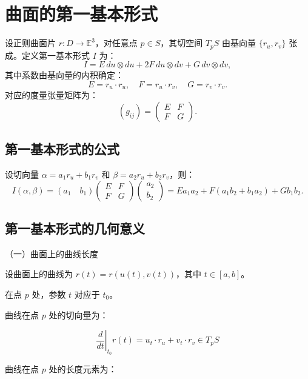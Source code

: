 \documentclass[lang=cn,10pt,thmcnt=section]{elegantbook}
\begin{document}
\section{曲面的第一基本形式}
\begin{definition}[第一基本形式]
    设正则曲面片 \( r: D \to \mathbb{E}^3 \)，对任意点 \( p \in S \)，其切空间 \( T_pS \) 由基向量 \(\{r_u, r_v\}\) 张成。定义第一基本形式 \( I \) 为：
\[
I = E \, du \otimes du + 2F \, du \otimes dv + G \, dv \otimes dv,
\]
其中系数由基向量的内积确定：
\[
E = r_u \cdot r_u, \quad F = r_u \cdot r_v, \quad G = r_v \cdot r_v.
\]
对应的度量张量矩阵为：
\[
(g_{ij}) = \begin{pmatrix}
E & F \\
F & G
\end{pmatrix}.
\]
\end{definition}
\subsection*{第一基本形式的公式}
设切向量 \(\alpha = a_1 r_u + b_1 r_v\) 和 \(\beta = a_2 r_u + b_2 r_v\)，则：
\[
I(\alpha, \beta) = (a_1 \quad b_1) \begin{pmatrix}
E & F \\
F & G
\end{pmatrix} \begin{pmatrix}
a_2 \\
b_2
\end{pmatrix} = E a_1 a_2 + F(a_1 b_2 + b_1 a_2) + G b_1 b_2.
\]

\subsection*{第一基本形式的几何意义}

（一）曲面上的曲线长度

设曲面上的曲线为 $r(t) = r(u(t), v(t))$，其中 $t \in [a, b]$。

在点 $p$ 处，参数 $t$ 对应于 $t_0$。

曲线在点 $p$ 处的切向量为：

$$
\left. \frac{d}{dt} \right|_{t_0} r(t) = u_t \cdot r_u + v_t \cdot r_v \in T_p S
$$

曲线在点 $p$ 处的长度元素为：
\end{document}
